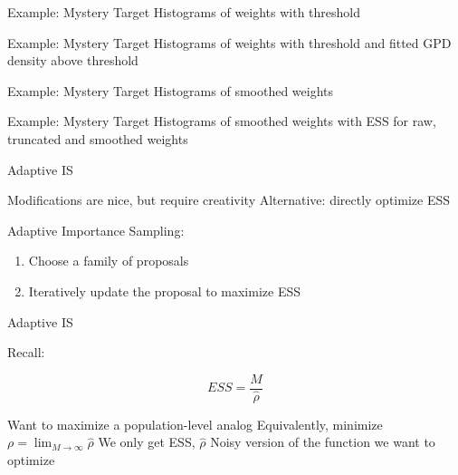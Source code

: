 \documentclass[14pt]{beamer}
\begin{document}
\begin{frame}{Example: Mystery Target}
    Histograms of weights with threshold
\end{frame}

\begin{frame}{Example: Mystery Target}
    Histograms of weights with threshold and fitted GPD density above threshold
\end{frame}

\begin{frame}{Example: Mystery Target}
    Histograms of smoothed weights
\end{frame}

\begin{frame}{Example: Mystery Target}
    Histograms of smoothed weights with ESS for raw, truncated and smoothed weights
\end{frame}

\begin{frame}{Adaptive IS}
    \begin{outline}
        \1 Modifications are nice, but require creativity
        \1 Alternative: directly optimize ESS \newline

        \1 Adaptive Importance Sampling: 
            \2 \citep{Aky21} \newline
    \end{outline}

    \begin{enumerate}
        [default]
        \item Choose a family of proposals
        \item Iteratively update the proposal to maximize ESS
    \end{enumerate}
\end{frame}

\begin{frame}{Adaptive IS}
    \begin{outline}
        \1 Recall: 
    \end{outline}
    \begin{equation*}
        ESS = \frac{M}{\hat{\rho}}
    \end{equation*}
    \begin{outline}
        \1 Want to maximize a population-level analog
            \2 Equivalently, minimize $\rho = \lim_{M \rightarrow \infty} \hat{\rho}$ \newline
        \1 We only get ESS, $\hat{\rho}$
        \1 Noisy version of the function we want to optimize
    \end{outline}
\end{frame}
\end{document}
